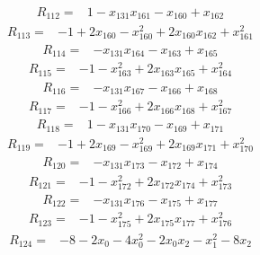 {%
\begin{align*}
R_{112} ={}& 1 - x_{131} x_{161} - x_{160} + x_{162}
\end{align*}
\begin{align*}
R_{113} ={}& -1 + 2x_{160} - x_{160}^{2} + 2x_{160} x_{162} + x_{161}^{2}
\end{align*}
\begin{align*}
R_{114} ={}& -x_{131} x_{164} - x_{163} + x_{165}
\end{align*}
\begin{align*}
R_{115} ={}& -1 - x_{163}^{2} + 2x_{163} x_{165} + x_{164}^{2}
\end{align*}
\begin{align*}
R_{116} ={}& -x_{131} x_{167} - x_{166} + x_{168}
\end{align*}
\begin{align*}
R_{117} ={}& -1 - x_{166}^{2} + 2x_{166} x_{168} + x_{167}^{2}
\end{align*}
\begin{align*}
R_{118} ={}& 1 - x_{131} x_{170} - x_{169} + x_{171}
\end{align*}
\begin{align*}
R_{119} ={}& -1 + 2x_{169} - x_{169}^{2} + 2x_{169} x_{171} + x_{170}^{2}
\end{align*}
\begin{align*}
R_{120} ={}& -x_{131} x_{173} - x_{172} + x_{174}
\end{align*}
\begin{align*}
R_{121} ={}& -1 - x_{172}^{2} + 2x_{172} x_{174} + x_{173}^{2}
\end{align*}
\begin{align*}
R_{122} ={}& -x_{131} x_{176} - x_{175} + x_{177}
\end{align*}
\begin{align*}
R_{123} ={}& -1 - x_{175}^{2} + 2x_{175} x_{177} + x_{176}^{2}
\end{align*}
\begin{align*}
R_{124} ={}& -8 - 2x_{0} - 4x_{0}^{2} - 2x_{0} x_{2} - x_{1}^{2} - 8x_{2} \\

\end{align*}}
